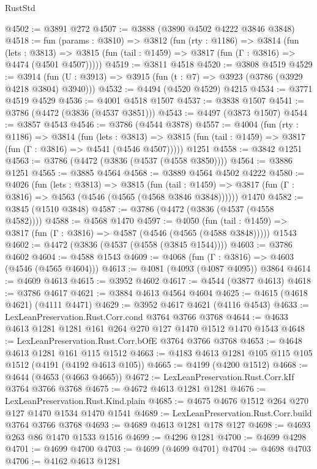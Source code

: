 \begin{lexlean}{RustStd}
\begin{coremodule}
@4502 := @3891 @272
@4507 := @3888 (@3890 @4502 @4222 @3846 @3848)
@4518 := fun (params : @3810) =>
  @3812
    (fun (rty : @1186) =>
    @3814
      (fun (lets : @3813) =>
      @3815 (fun (tail : @1459) => @3817 (fun (Γ : @3816) => @4474 (@4501 @4507)))))
@4519 := @3811 @4518
@4520 := @3808 @4519
@4529 := @3914 (fun (U : @3913) => @3915 (fun (t : @7) => @3923 (@3786 (@3929 @4218 @3804) @3940)))
@4532 := @4494 (@4520 @4529) @4215
@4534 := @3771 @4519 @4529
@4536 := @4001 @4518 @1507
@4537 := @3838 @1507
@4541 := @3786 (@4472 (@3836 (@4537 @3851)))
@4543 := @4497 (@3873 @1507)
@4544 := @3857 @4543
@4546 := @3786 (@4544 @3878)
@4557 := @4004
    (fun (rty : @1186) =>
    @3814
      (fun (lets : @3813) =>
      @3815 (fun (tail : @1459) => @3817 (fun (Γ : @3816) => @4541 (@4546 @4507)))))
    @1251
@4558 := @3842 @1251
@4563 := @3786 (@4472 (@3836 (@4537 (@4558 @3850))))
@4564 := @3886 @1251
@4565 := @3885 @4564
@4568 := @3889 @4564 @4502 @4222
@4580 := @4026
    (fun (lets : @3813) =>
    @3815
      (fun (tail : @1459) => @3817 (fun (Γ : @3816) => @4563 (@4546 (@4565 (@4568 @3846 @3848))))))
    @1470
@4582 := @3845 (@1510 @3848)
@4587 := @3786 (@4472 (@3836 (@4537 (@4558 @4582))))
@4588 := @4568 @1470
@4597 := @4050
    (fun (tail : @1459) => @3817 (fun (Γ : @3816) => @4587 (@4546 (@4565 (@4588 @3848)))))
    @1543
@4602 := @4472 (@3836 (@4537 (@4558 (@3845 @1544))))
@4603 := @3786 @4602
@4604 := @4588 @1543
@4609 := @4068 (fun (Γ : @3816) => @4603 (@4546 (@4565 @4604)))
@4613 := @4081 (@4093 (@4087 @4095)) @3864
@4614 := @4609 @4613
@4615 := @3952 @4602
@4617 := @4544 (@3877 @4613)
@4618 := @3786 @4617
@4621 := @3884 @4613 @4564 @4604
@4625 := @4615 (@4618 @4621) (@4111 @4471)
@4629 := @3952 @4617 @4621 (@4116 @4543)
@4633 := LexLeanPreservation.Rust.Corr.cond @3764 @3766 @3768
@4644 := @4633 @4613 @1281 @1281 @161 @264 @270 @127 @1470 @1512 @1470 @1543
@4648 := LexLeanPreservation.Rust.Corr.bOfE @3764 @3766 @3768
@4653 := @4648 @4613 @1281 @161 @115 @1512
@4663 := @4183 @4613 @1281 @105 @115 @105 @1512 (@4191 (@4192 @4613 @105))
@4665 := @4199 (@4200 @1512)
@4668 := @4644 (@4653 (@4663 @4665))
@4672 := LexLeanPreservation.Rust.Corr.kIf @3764 @3766 @3768
@4675 := @4672 @4613 @1281 @1281
@4676 := LexLeanPreservation.Rust.Kind.plain
@4685 := @4675 @4676 @1512 @264 @270 @127 @1470 @1534 @1470 @1541
@4689 := LexLeanPreservation.Rust.Corr.build @3764 @3766 @3768
@4693 := @4689 @4613 @1281 @178 @127
@4698 := @4693 @263 @86 @1470 @1533 @1516
@4699 := @4296 @1281
@4700 := @4699 @4298
@4701 := @4699 @4700
@4703 := @4699 (@4699 @4701)
@4704 := @4698 @4703
@4706 := @4162 @4613 @1281

\end{coremodule}
\end{lexlean}
